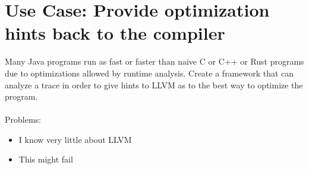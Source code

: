 \section{Use Case: Provide optimization hints back to the compiler}
Many Java programs run as fast or faster than naive C or C++ or Rust programs due to optimizations allowed by runtime analysis. Create a framework that can analyze a trace in order to give hints to LLVM as to the best way to optimize the program.
\\
\\
Problems:
\begin{itemize}
  \item I know very little about LLVM
  \item This might fail
\end{itemize}




